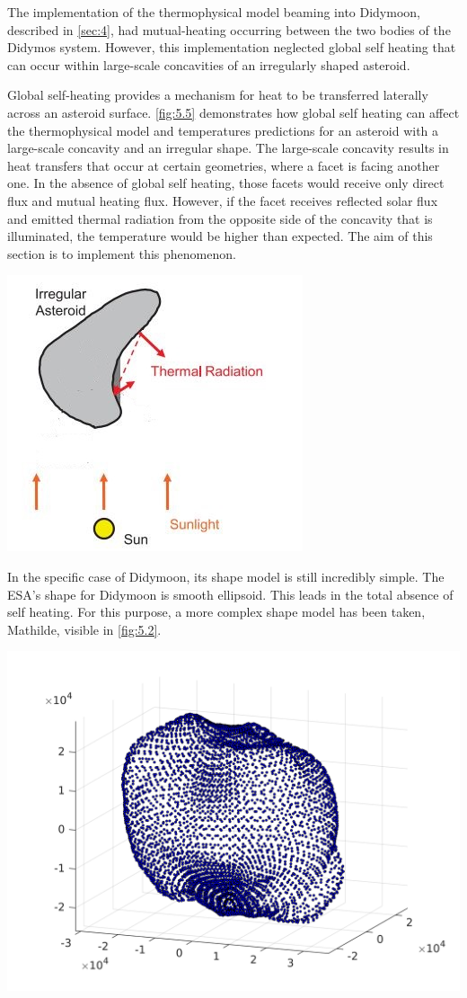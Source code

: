 The implementation of the thermophysical model beaming into Didymoon, described in \autoref{sec:4}, had mutual-heating occurring between the two bodies of the Didymos system. However, this implementation neglected global self heating that can occur within large-scale concavities of an irregularly shaped asteroid.

Global self-heating provides a mechanism for heat to be transferred laterally across an asteroid surface. \autoref{fig:5.5} demonstrates how global self heating can affect the thermophysical model and temperatures predictions for an asteroid with a large-scale concavity and an irregular shape. The large-scale concavity results in heat transfers that occur at certain geometries, where a facet is facing another one. In the absence of global self heating, those facets would receive only direct flux and mutual heating flux. However, if the facet receives reflected solar flux and emitted thermal radiation from the opposite side of the concavity that is illuminated, the temperature would be higher than expected. The aim of this section is to implement this phenomenon.

\begin{center}
    \includegraphics[width=0.5\linewidth]{rsc/self.jpg}
    \label{fig:5.1}
\end{center}

In the specific case of Didymoon, its shape model is still incredibly simple. The ESA's shape for Didymoon is smooth ellipsoid. This leads in the total absence of self heating. For this purpose, a more complex shape model has been taken, Mathilde, visible in \autoref{fig:5.2}.
\begin{center}
    \includegraphics[width=0.7\linewidth]{rsc/mathilde.png}
    \label{fig:5.2}
\end{center}

